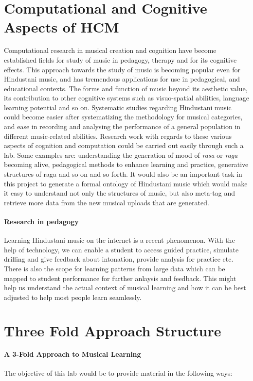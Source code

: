 \documentclass{tufte-handout}
\begin{document}
\section{Computational and Cognitive Aspects of HCM}
Computational research in musical creation and cognition have become established fields for study of music in pedagogy, therapy and for its cognitive effects. This approach towards the study of music is becoming popular even for Hindustani music, and has tremendous applications for use in pedagogical, and educational contexts. The forms and function of music beyond its aesthetic value, its contribution to other cognitive systems such as visuo-spatial abilities, language learning potential and so on. Systematic studies regarding Hindustani music could become easier after systematizing the methodology for musical categories, and ease in recording and analysing the performance of a general population in different music-related abilities.  
Research work with regards to these various aspects of cognition and computation could be carried out easily through such a lab. Some
examples are: understanding the generation of mood of
\emph{rasa} or \emph{raga} becoming alive, pedagogical
methods to enhance learning and practice, generative
structures of raga and so on and so forth. It would also be
an important task in this project to generate a formal
ontology of Hindustani music which would make it easy to
understand not only the structures of music, but also
meta-tag and retrieve more data from the new musical uploads
that are generated.

\paragraph{Research in pedagogy}
Learning Hindustani music on the internet is a recent phenomenon. With the help of technology, we can enable a student to access guided practice, simulate drilling and give feedback about
intonation, provide analysis for practice etc. There is also
the scope for learning patterns from large data which can be
mapped to student performance for further anlaysis and
feedback. This might help us understand the actual context of musical learning and how it can be best adjusted to help most people learn seamlessly.


\section{Three Fold Approach Structure}

\paragraph{A 3-Fold Approach to Musical Learning} The
objective of this lab would be to provide material in the
following ways:
\end{document}
